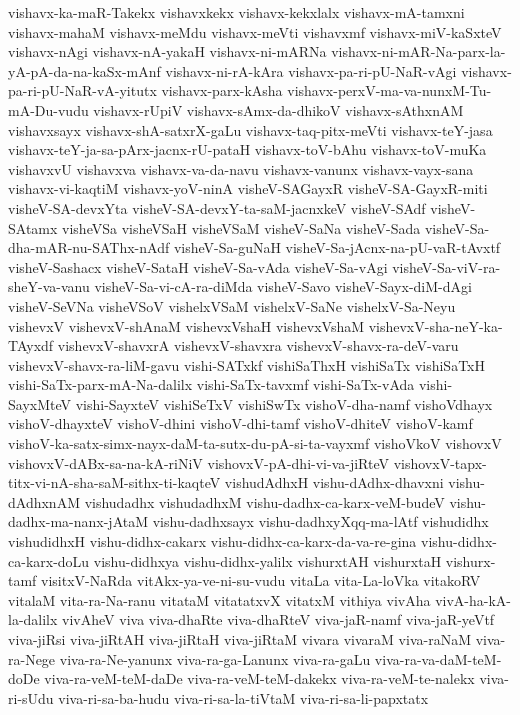 {vishavx-ka-maR-Takekx
vishavxkekx
vishavx-kekxlalx
vishavx-mA-tamxni
vishavx-mahaM
vishavx-meMdu
vishavx-meVti
vishavxmf
vishavx-miV-kaSxteV
vishavx-nAgi
vishavx-nA-yakaH
vishavx-ni-mARNa
vishavx-ni-mAR-Na-parx-la-yA-pA-da-na-kaSx-mAnf
vishavx-ni-rA-kAra
vishavx-pa-ri-pU-NaR-vAgi
vishavx-pa-ri-pU-NaR-vA-yitutx
vishavx-parx-kAsha
vishavx-perxV-ma-va-nunxM-Tu-mA-Du-vudu
vishavx-rUpiV
vishavx-sAmx-da-dhikoV
vishavx-sAthxnAM
vishavxsayx
vishavx-shA-satxrX-gaLu
vishavx-taq-pitx-meVti
vishavx-teY-jasa
vishavx-teY-ja-sa-pArx-jacnx-rU-pataH
vishavx-toV-bAhu
vishavx-toV-muKa
vishavxvU
vishavxva
vishavx-va-da-navu
vishavx-vanunx
vishavx-vayx-sana
vishavx-vi-kaqtiM
vishavx-yoV-ninA
visheV-SAGayxR
visheV-SA-GayxR-miti
visheV-SA-devxYta
visheV-SA-devxY-ta-saM-jacnxkeV
visheV-SAdf
visheV-SAtamx
visheVSa
visheVSaH
visheVSaM
visheV-SaNa
visheV-Sada
visheV-Sa-dha-mAR-nu-SAThx-nAdf
visheV-Sa-guNaH
visheV-Sa-jAcnx-na-pU-vaR-tAvxtf
visheV-Sashacx
visheV-SataH
visheV-Sa-vAda
visheV-Sa-vAgi
visheV-Sa-viV-ra-sheY-va-vanu
visheV-Sa-vi-cA-ra-diMda
visheV-Savo
visheV-Sayx-diM-dAgi
visheV-SeVNa
visheVSoV
vishelxVSaM
vishelxV-SaNe
vishelxV-Sa-Neyu
vishevxV
vishevxV-shAnaM
vishevxVshaH
vishevxVshaM
vishevxV-sha-neY-ka-TAyxdf
vishevxV-shavxrA
vishevxV-shavxra
vishevxV-shavx-ra-deV-varu
vishevxV-shavx-ra-liM-gavu
vishi-SATxkf
vishiSaThxH
vishiSaTx
vishiSaTxH
vishi-SaTx-parx-mA-Na-dalilx
vishi-SaTx-tavxmf
vishi-SaTx-vAda
vishi-SayxMteV
vishi-SayxteV
vishiSeTxV
vishiSwTx
vishoV-dha-namf
vishoVdhayx
vishoV-dhayxteV
vishoV-dhini
vishoV-dhi-tamf
vishoV-dhiteV
vishoV-kamf
vishoV-ka-satx-simx-nayx-daM-ta-sutx-du-pA-si-ta-vayxmf
vishoVkoV
vishovxV
vishovxV-dABx-sa-na-kA-riNiV
vishovxV-pA-dhi-vi-va-jiRteV
vishovxV-tapx-titx-vi-nA-sha-saM-sithx-ti-kaqteV
vishudAdhxH
vishu-dAdhx-dhavxni
vishu-dAdhxnAM
vishudadhx
vishudadhxM
vishu-dadhx-ca-karx-veM-budeV
vishu-dadhx-ma-nanx-jAtaM
vishu-dadhxsayx
vishu-dadhxyXqq-ma-lAtf
vishudidhx
vishudidhxH
vishu-didhx-cakarx
vishu-didhx-ca-karx-da-va-re-gina
vishu-didhx-ca-karx-doLu
vishu-didhxya
vishu-didhx-yalilx
vishurxtAH
vishurxtaH
vishurx-tamf
visitxV-NaRda
vitAkx-ya-ve-ni-su-vudu
vitaLa
vita-La-loVka
vitakoRV
vitalaM
vita-ra-Na-ranu
vitataM
vitatatxvX
vitatxM
vithiya
vivAha
vivA-ha-kA-la-dalilx
vivAheV
viva
viva-dhaRte
viva-dhaRteV
viva-jaR-namf
viva-jaR-yeVtf
viva-jiRsi
viva-jiRtAH
viva-jiRtaH
viva-jiRtaM
vivara
vivaraM
viva-raNaM
viva-ra-Nege
viva-ra-Ne-yanunx
viva-ra-ga-Lanunx
viva-ra-gaLu
viva-ra-va-daM-teM-doDe
viva-ra-veM-teM-daDe
viva-ra-veM-teM-dakekx
viva-ra-veM-te-nalekx
viva-ri-sUdu
viva-ri-sa-ba-hudu
viva-ri-sa-la-tiVtaM
viva-ri-sa-li-papxtatx
}
